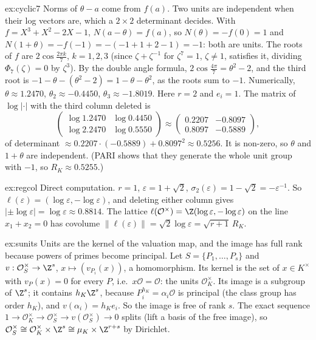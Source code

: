 \begin{solution}{ex:cyclic7}
\idea Norms of $\theta-a$ come from $f(a)$. Two units are independent when their log vectors are, which a $2\times2$ determinant
decides.
\writeup With $f=X^3+X^2-2X-1$, $N(a-\theta)=f(a)$, so $N(\theta)=-f(0)=1$ and $N(1+\theta)=-f(-1)=-(-1+1+2-1)=-1$: both are
units. The roots of $f$ are $2\cos\frac{2\pi k}7$, $k=1,2,3$ (since $\zeta+\zeta^{-1}$ for $\zeta^7=1$, $\zeta\ne1$, satisfies it,
dividing $\Phi_7(\zeta)=0$ by $\zeta^3$). By the double angle formula, $2\cos\frac{4\pi}7=\theta^2-2$, and the third root is
$-1-\theta-(\theta^2-2)=1-\theta-\theta^2$, as the roots sum to $-1$. Numerically, $\theta\approx1.2470$, $\theta_2\approx
-0.4450$, $\theta_3\approx-1.8019$. Here $r=2$ and $e_i=1$. The matrix of $\log|\cdot|$ with the third column deleted is
\[
\begin{pmatrix}\log1.2470&\log0.4450\\\log2.2470&\log0.5550\end{pmatrix}\approx\begin{pmatrix}0.2207&-0.8097\\0.8097&-0.5889
\end{pmatrix},
\]
of determinant $\approx0.2207\cdot(-0.5889)+0.8097^2\approx0.5256$. It is non-zero, so $\theta$ and $1+\theta$ are
independent. (PARI shows that they generate the whole unit group with $-1$, so $R_K\approx0.5255$.)
\end{solution}

\begin{solution}{ex:regcol}
\idea Direct computation.
\writeup $r=1$, $\varepsilon=1+\sqrt2$, $\sigma_2(\varepsilon)=1-\sqrt2=-\varepsilon^{-1}$. So $\ell(\varepsilon)=(\log\varepsilon,
-\log\varepsilon)$, and deleting either column gives $|\pm\log\varepsilon|=\log\varepsilon\approx0.8814$. The lattice
$\ell(\mathcal O^\times)=\Z(\log\varepsilon,-\log\varepsilon)$ on the line $x_1+x_2=0$ has covolume $\|\ell(\varepsilon)\|=
\sqrt2\log\varepsilon=\sqrt{r+1}\,R_K$.
\end{solution}

\begin{solution}{ex:sunits}
\idea Units are the kernel of the valuation map, and the image has full rank because powers of primes become principal.
\writeup Let $S=\{P_1,\dots,P_s\}$ and $v:\mathcal O_S^\times\to\Z^s$, $x\mapsto(v_{P_i}(x))$, a homomorphism. Its kernel is the set
of $x\in K^\times$ with $v_P(x)=0$ for every $P$, i.e.\ $x\mathcal O=\mathcal O$: the units $\mathcal O_K^\times$. Its image is a
subgroup of $\Z^s$; it contains $h_K\Z^s$, because $P_i^{h_K}=\alpha_i\mathcal O$ is principal (the class group has order $h_K$),
and $v(\alpha_i)=h_Ke_i$. So the image is free of rank $s$. The exact sequence $1\to\mathcal O_K^\times\to\mathcal O_S^\times
\to v(\mathcal O_S^\times)\to0$ splits (lift a basis of the free image), so $\mathcal O_S^\times\cong\mathcal O_K^\times\times
\Z^s\cong\mu_K\times\Z^{r+s}$ by Dirichlet.
\end{solution}

